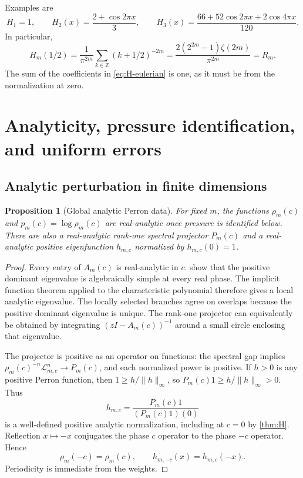 \documentclass[11pt,a4paper]{article}
\numberwithin{equation}{section}
\newtheorem{proposition}[proposition]{Proposition}
\theoremstyle{definition}
\theoremstyle{remark}
\newcommand{\ZZ}{\mathbb Z}
\newcommand{\Lop}{\mathcal L}
\begin{document}
Examples are
\[
 H_1=1,\qquad
 H_2(x)=\frac{2+\cos2\pi x}{3},\qquad
 H_3(x)=\frac{66+52\cos2\pi x+2\cos4\pi x}{120}.
\]
In particular,
\begin{equation}
 H_m(1/2)=\frac1{\pi^{2m}}\sum_{k\in\ZZ}(k+1/2)^{-2m}
 =\frac{2(2^{2m}-1)\zeta(2m)}{\pi^{2m}}=R_m.
 \label{eq:H-half}
\end{equation}
The sum of the coefficients in \cref{eq:H-eulerian} is one, as it must
be from the normalization at zero.

\section{Analyticity, pressure identification, and uniform errors}
\label{sec:analytic}

\subsection{Analytic perturbation in finite dimensions}
\begin{proposition}[Global analytic Perron data]
\label{prop:analytic-data}
For fixed $m$, the functions $\rho_m(c)$ and $p_m(c)=\log\rho_m(c)$
are real-analytic once pressure is identified below. There are also a
real-analytic rank-one spectral projector $P_m(c)$ and a real-analytic
positive eigenfunction $h_{m,c}$ normalized by $h_{m,c}(0)=1$.
\end{proposition}
\begin{proof}
Every entry of $A_m(c)$ is real-analytic in $c$.
 show that the positive dominant
eigenvalue is algebraically simple at every real phase. The implicit
function theorem applied to the characteristic polynomial therefore
gives a local analytic eigenvalue. The locally selected branches agree
on overlaps because the positive dominant eigenvalue is unique.
The rank-one projector can equivalently be obtained by integrating
$(zI-A_m(c))^{-1}$ around a small circle enclosing that eigenvalue.

The projector is positive as an operator on functions: the spectral gap
implies $\rho_m(c)^{-n}\Lop_{m,c}^n\to P_m(c)$, and each normalized
power is positive. If $h>0$ is any positive Perron function, then
$1\geq h/\|h\|_\infty$, so
$P_m(c)1\geq h/\|h\|_\infty>0$. Thus
\[
 h_{m,c}=\frac{P_m(c)1}{(P_m(c)1)(0)}
\]
is a well-defined positive analytic normalization, including at $c=0$
by \cref{thm:H}. Reflection $x\mapsto-x$ conjugates the phase $c$
operator to the phase $-c$ operator. Hence
\begin{equation}
 \rho_m(-c)=\rho_m(c),\qquad
 h_{m,-c}(x)=h_{m,c}(-x).
 \label{eq:reflection}
\end{equation}
Periodicity is immediate from the weights.
\end{proof}
\end{document}
